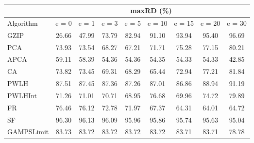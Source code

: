 \begin{table}[h]
\newcommand{\cpca}{\cellcolor{cyan!20}}
\newcommand{\capca}{\cellcolor{green!20}}
\newcommand{\cfr}{\cellcolor{yellow!25}}
\newcommand{\cgzip}{\cellcolor{orange!20}}
\newcommand{\best}{\cellcolor{gray!30}}
\centering\hspace*{0cm}\begin{tabular}{| l | c | c | c | c | c | c | c | c |}\cline{2-9}\multicolumn{1}{c|}{}& \multicolumn{8}{c|}{maxRD (\%)}\\\hline
{Algorithm} & {e = 0} & {e = 1} & {e = 3} & {e = 5} & {e = 10} & {e = 15} & {e = 20} & {e = 30} \\\hline
{GZIP\cgzip} & {\best26.66} & {\best47.99} & {73.79} & {82.94} & {91.10} & {93.94} & {95.40} & {96.69} \\\hline
{PCA\cpca} & {73.93} & {73.54} & {68.27} & {67.21} & {71.71} & {75.28} & {77.15} & {80.21} \\\hline
{APCA\capca} & {59.11} & {58.39} & {\best54.36} & {\best54.36} & {\best54.35} & {\best54.33} & {\best54.33} & {\best42.85} \\\hline
{CA} & {73.82} & {73.45} & {69.31} & {68.29} & {65.44} & {72.94} & {77.21} & {81.84} \\\hline
{PWLH} & {87.51} & {87.45} & {87.36} & {87.26} & {87.01} & {86.86} & {88.94} & {91.19} \\\hline
{PWLHInt} & {71.26} & {71.01} & {70.71} & {68.95} & {76.68} & {69.96} & {74.72} & {79.89} \\\hline
{FR\cfr} & {76.46} & {76.12} & {72.78} & {71.97} & {67.37} & {64.31} & {64.01} & {64.72} \\\hline
{SF} & {96.30} & {96.13} & {96.09} & {95.96} & {95.86} & {95.74} & {95.63} & {95.04} \\\hline
{GAMPSLimit} & {83.73} & {83.72} & {83.72} & {83.72} & {83.72} & {83.71} & {83.71} & {78.78} \\\hline
\end{tabular}
\caption{\captionminmaxtwo}
\label{experiments:minmaxtwo}
\end{table}
